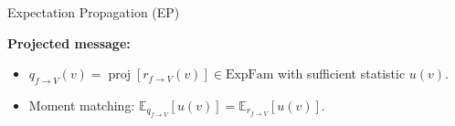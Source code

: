 \documentclass[english]{beamer}
\DeclareMathOperator*{\proj}{\text{proj}} %
\begin{document}
\begin{frame}
\begin{columns}[t]
\begin{block}{Expectation Propagation (EP)}

\vspace{-20mm}
\begin{figure}[ht]
\centering
\end{figure}
%
\vspace{1cm}
\textbf{Projected message:} 

\begin{itemize}
    \item $q_{f\rightarrow V}(v)=\proj\left[r_{f\rightarrow V}(v)\right] \in
        \text{ExpFam}$ with sufficient statistic $u(v)$.

    \item Moment matching: $\mathbb{E}_{q_{f\rightarrow
        V}}\left[u(v)\right]=\mathbb{E}_{r_{f\rightarrow V}}\left[u(v)\right] $.
\end{itemize}


\end{block}
\end{columns}
\end{frame}
\end{document}
